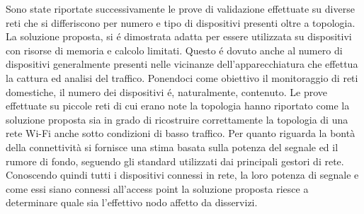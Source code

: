 Sono state riportate successivamente le prove di validazione effettuate su diverse reti che si differiscono per numero e tipo di dispositivi presenti oltre a topologia.
La soluzione proposta, si \'e dimostrata adatta per essere utilizzata su dispositivi con risorse di memoria e calcolo limitati.
Questo \'e dovuto anche al numero di dispositivi generalmente presenti nelle vicinanze dell'apparecchiatura che effettua la cattura ed analisi del traffico.
Ponendoci come obiettivo il monitoraggio di reti domestiche, il numero dei dispositivi \'e, naturalmente, contenuto.
Le prove effettuate su piccole reti di cui erano note la topologia hanno riportato come la soluzione proposta sia in grado di ricostruire correttamente la topologia di una rete Wi-Fi anche sotto condizioni di basso traffico.
Per quanto riguarda la bont\`a della connettivit\`a si fornisce una stima basata sulla potenza del segnale ed il rumore di fondo, seguendo gli standard utilizzati dai principali gestori di rete.
Conoscendo quindi tutti i dispositivi connessi in rete, la loro potenza di segnale e  come essi siano connessi all'access point la soluzione proposta riesce a determinare  quale sia l'effettivo nodo affetto da disservizi.
